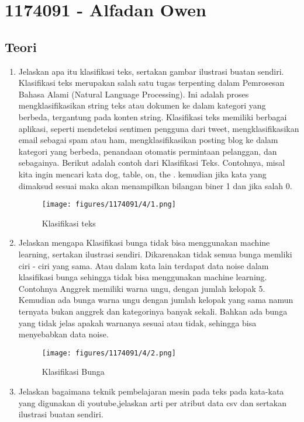 \section{1174091 - Alfadan Owen}
\subsection{Teori}
\begin{enumerate}

	\item Jelaskan apa itu klasifikasi teks, sertakan gambar ilustrasi buatan sendiri.
	\hfill\break
	Klasifikasi teks merupakan salah satu tugas terpenting dalam Pemrosesan Bahasa Alami (Natural Language Processing). Ini adalah proses mengklasifikasikan string teks atau dokumen ke dalam kategori yang berbeda, tergantung pada konten string. Klasifikasi teks memiliki berbagai aplikasi, seperti mendeteksi sentimen pengguna dari tweet, mengklasifikasikan email sebagai spam atau ham, mengklasifikasikan posting blog ke dalam kategori yang berbeda, penandaan otomatis permintaan pelanggan, dan sebagainya. Berikut adalah contoh dari Klasifikasi Teks. Contohnya, misal kita ingin mencari kata dog, table, on, the . kemudian jika kata yang dimaksud sesuai maka akan menampilkan bilangan biner 1 dan jika salah 0. 
	\begin{figure}[H]
	\centering
		\texttt{[image: figures/1174091/4/1.png]}
		\caption{Klasifikasi teks}
	\end{figure}
	
	\item Jelaskan mengapa Klasifikasi bunga tidak bisa menggunakan machine learning, sertakan ilustrasi sendiri.	
	\hfill\break
	Dikarenakan tidak semua bunga memliki ciri - ciri yang sama. Atau dalam kata lain terdapat data noise dalam klasifikasi bunga sehingga tidak bisa menggunakan machine learning. Contohnya Anggrek memiliki warna ungu, dengan jumlah kelopak 5. Kemudian ada bunga warna ungu dengan jumlah kelopak yang sama namun ternyata bukan anggrek dan kategorinya banyak sekali. Bahkan ada bunga yang tidak jelas apakah warnanya sesuai atau tidak, sehingga bisa menyebabkan data noise.

	\begin{figure}[H]
	\centering
		\texttt{[image: figures/1174091/4/2.png]}
		\caption{Klasifikasi Bunga}
	\end{figure}

	\item Jelaskan bagaimana teknik pembelajaran mesin pada teks pada kata-kata yang digunakan di youtube,jelaskan arti per atribut data csv dan sertakan ilustrasi buatan sendiri.


\end{enumerate}
